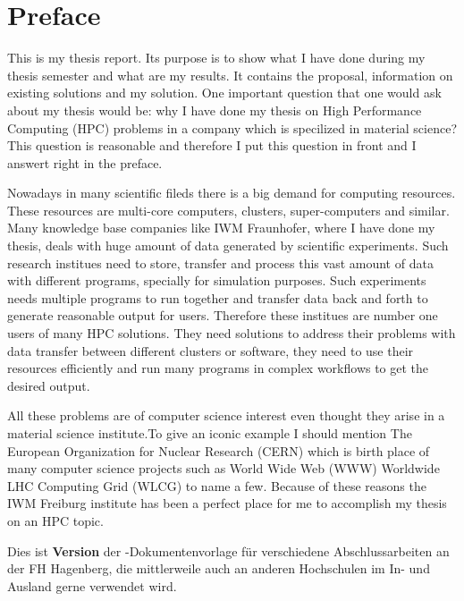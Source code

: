 \chapter{Preface} 	%

This is my thesis report. Its purpose is to show what I have done during my thesis semester and what are my results. It contains the proposal,
information on existing solutions and my solution. One important question that one
would ask about my thesis would be: why I have done my thesis on High Performance
Computing (HPC) problems in a company which is specilized in material science?
This question is reasonable and therefore I put this question in front and I 
answert right in the preface. 

Nowadays in many scientific fileds there is a big demand for computing resources.
These resources are multi-core computers, clusters, super-computers and similar. 
Many knowledge base companies like IWM Fraunhofer, where I have done my thesis, 
deals with huge amount of data generated by scientific experiments. Such research 
institues need to store, transfer and process this vast amount of data with different
programs, specially for simulation purposes. Such experiments needs multiple programs
to run together and transfer data back and forth to generate reasonable output for
users. Therefore these institues are number one users of many HPC solutions. They
need solutions to address their problems with data transfer between different clusters
or software, they need to use their resources efficiently and run many programs in
complex workflows to get the desired output. 

All these problems are of computer science interest even thought they arise 
in a material science institute.To give an iconic example I should mention The European Organization for Nuclear
Research (CERN) which is birth place of many computer science projects such as
World Wide Web (WWW) Worldwide LHC Computing Grid (WLCG)\cite{WLCG} to name a few.
Because of these reasons the IWM Freiburg institute has been a perfect place for me
to accomplish my thesis on an HPC topic.


Dies ist \textbf{Version \hgbthesisDate} der \latex-Dokumentenvorlage für 
verschiedene Abschlussarbeiten an der FH Hagenberg, die mittlerweile auch 
an anderen Hochschulen im In- und Ausland gerne verwendet wird.

